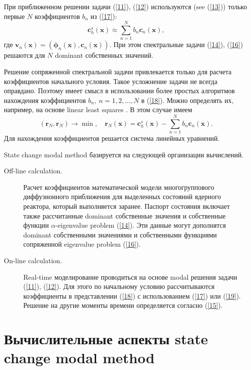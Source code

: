 \documentclass[authoryear]{elsarticle}
\begin{document}
При приближенном решении задачи  (\ref{11}), (\ref{12}) используются 
(see (\ref{13})) только первые $N$ коэффициентов $b_n$ из (\ref{17}):
\begin{equation}\label{18}
 \bm c_h^s (\bm x) \approx  \sum_{n=1}^{N} b_n \bm c_n(\bm x) ,
\end{equation} 
где $\bm v_n (\bm x) = (\bm \phi_n (\bm x), \bm c_n (\bm x))$.
При этом спектральные задачи  (\ref{14}), (\ref{16}) решаются для $N$ dominant собственных
значений.

Решение сопряженной спектральной задачи привлекается только для расчета
коэффициентов начального условия. Такое усложнение задачи не всегда оправдано.
Поэтому имеет смысл в  использовании более простых алгоритмов нахождения
коэффициентов $b_n, \ n = 1,2, ..., N$ в (\ref{18}).
Можно определять их, например, на основе linear least squares \citep{LSPk1996,verdu2014modal}.
В этом случае имеем
\begin{equation}\label{19}
 (\bm r_N, \bm r_N) \longrightarrow \min, 
 \quad \bm r_N (\bm x)  = \bm c_h^s (\bm x) -  \sum_{n=1}^{N} b_n \bm c_n(\bm x) .
\end{equation} 
Для нахождения коэффициентов решается система линейных уравнений.

State change modal method базируется на следующей организации вычислений.
\begin{description}
 \item[Off-line calculation.] Расчет коэффициентов математической модели многогруппового диффузионного приближения
для выделенных состояний ядерного реактора, который выполняется заранее. Паспорт состояния включает также рассчитанные dominant 
собственные значения и собственные функции $\alpha$-eigenvalue problem (\ref{14}). 
Эти данные могут дополнятся  dominant 
собственными значениями и собственными функциями сопряженной eigenvalue problem (\ref{16}).
 \item[On-line calculation.] Real-time моделирование проводиться на основе modal решения задачи (\ref{11}), (\ref{12}).
Для этого по начальному условию рассчитываются коэффициенты в представлении (\ref{18}) с использованием (\ref{17})
или (\ref{19}). Решение на другие моменты времени определяется согласно (\ref{15}).   
\end{description}  

\section{Вычислительные аспекты state change modal method} 
\end{document}
